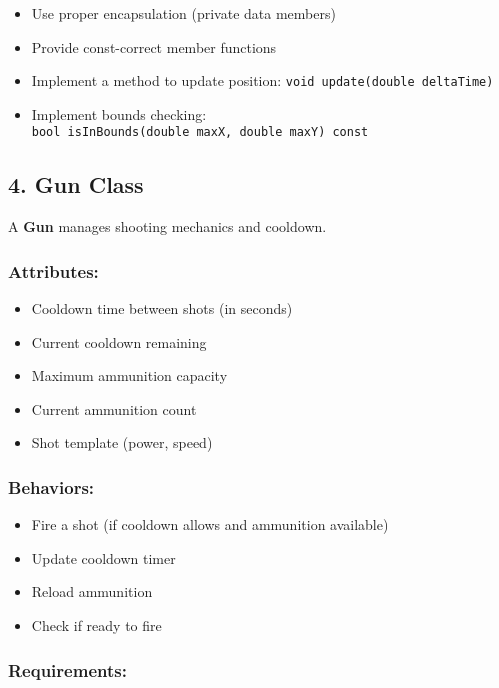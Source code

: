 \documentclass[
]{article}
\providecommand{\tightlist}{%
  \setlength{\itemsep}{0pt}\setlength{\parskip}{0pt}}
\begin{document}
\begin{itemize}
\tightlist
\item
  Use proper encapsulation (private data members)
\item
  Provide const-correct member functions
\item
  Implement a method to update position:
  \texttt{void\ update(double\ deltaTime)}
\item
  Implement bounds checking:
  \texttt{bool\ isInBounds(double\ maxX,\ double\ maxY)\ const}
\end{itemize}

\subsection{4. Gun Class}\label{gun-class}

A \textbf{Gun} manages shooting mechanics and cooldown.

\subsubsection{Attributes:}\label{attributes-1}

\begin{itemize}
\tightlist
\item
  Cooldown time between shots (in seconds)
\item
  Current cooldown remaining
\item
  Maximum ammunition capacity
\item
  Current ammunition count
\item
  Shot template (power, speed)
\end{itemize}

\subsubsection{Behaviors:}\label{behaviors-1}

\begin{itemize}
\tightlist
\item
  Fire a shot (if cooldown allows and ammunition available)
\item
  Update cooldown timer
\item
  Reload ammunition
\item
  Check if ready to fire
\end{itemize}

\subsubsection{Requirements:}\label{requirements-1}
\end{document}
